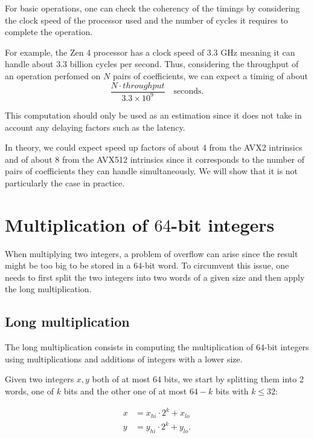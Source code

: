\documentclass[a4paper]{article}
\begin{document}
\begin{remark}
    For basic operations, one can check the coherency of the timings by considering the clock speed of
    the processor used and the number of cycles it requires to complete the operation.
    
    For example, the Zen 4 processor has a clock speed of 3.3 GHz meaning it can handle about 
    3.3 billion cycles per second. Thus, considering the throughput of an operation perfomed on
    $N$ pairs of coefficients, we can expect a timing of about
    \[
    \dfrac{N\cdot throughput}{3.3\times 10^9}\quad \text{seconds}.
    \]

    This computation should only be used as an estimation since it does not take in account any
    delaying factors such as the latency.
\end{remark}

\bigskip
In theory, we could expect speed up factors of about 4 from the AVX2 intrinsics and of about 8 from the AVX512 intrinsics
since it corresponds to the number of pairs of coefficients they can handle simultaneously.
We will show that it is not particularly the case in practice.


\section{Multiplication of $64$-bit integers} \label{mulsplit}

When multiplying two integers, a problem of overflow can arise since the result might be too big to be stored in a $64$-bit word. 
To circumvent this issue, one needs to first split the two integers into two words of a given size and then apply the long multiplication.

\subsection{Long multiplication}

The long multiplication consists in computing the multiplication of $64$-bit integers using multiplications and additions of
integers with a lower size.

\bigskip
Given two integers $x,y$ both of at most $64$ bits, we start by splitting them into 2 words, one of $k$ bits and the other one of at most $64-k$
bits with $k\leq32$:

\begin{align*}
    x &= x_{hi}\cdot 2^{k} + x_{lo} \\
    y &= y_{hi}\cdot 2^{k} + y_{lo}.
\end{align*}
\end{document}
